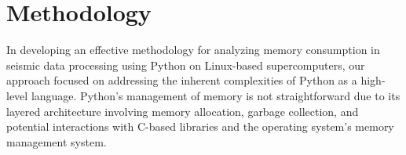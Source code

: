 \section{Methodology}

In developing an effective methodology for analyzing memory consumption in seismic data processing using Python on Linux-based supercomputers, our approach focused on addressing the inherent complexities of Python as a high-level language.
Python's management of memory is not straightforward due to its layered architecture involving memory allocation, garbage collection, and potential interactions with C-based libraries and the operating system's memory management system.




